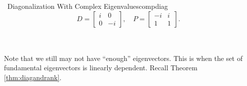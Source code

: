 \begin{example}{\Difficulty\,\Difficulty\,\,Diagonalization With Complex Eigenvalues}{compdiag}
            \begin{equation*}
                D=\begin{bmatrix}
                    i & 0 \\
                    0 & -i
                \end{bmatrix},\quad
                P=\begin{bmatrix}
                    -i & i \\
                    1 & 1
                \end{bmatrix}.
            \end{equation*}
            
        \end{example}
        \vphantom
        \\
        \\
        Note that we still may not have ``enough'' eigenvectors. This is when the set of fundamental eigenvectors is linearly dependent. Recall Theorem \ref{thm:diagandrank}.
